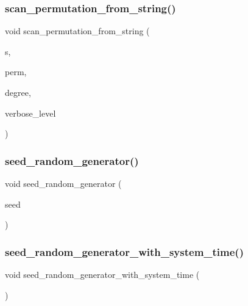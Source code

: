 \subsubsection{\texorpdfstring{scan\+\_\+permutation\+\_\+from\+\_\+string()}{scan\_permutation\_from\_string()}}
{\footnotesize\ttfamily void scan\+\_\+permutation\+\_\+from\+\_\+string (\begin{DoxyParamCaption}\item[{const char $\ast$}]{s,  }\item[{\mbox{\hyperlink{galois_8h_a09fddde158a3a20bd2dcadb609de11dc}{I\+NT}} $\ast$\&}]{perm,  }\item[{\mbox{\hyperlink{galois_8h_a09fddde158a3a20bd2dcadb609de11dc}{I\+NT}} \&}]{degree,  }\item[{\mbox{\hyperlink{galois_8h_a09fddde158a3a20bd2dcadb609de11dc}{I\+NT}}}]{verbose\+\_\+level }\end{DoxyParamCaption})}

\mbox{\label{util_8_c_a4a73fe7c1b8801c8a2cf489ee793f06a}} 
\subsubsection{\texorpdfstring{seed\+\_\+random\+\_\+generator()}{seed\_random\_generator()}}
{\footnotesize\ttfamily void seed\+\_\+random\+\_\+generator (\begin{DoxyParamCaption}\item[{\mbox{\hyperlink{galois_8h_a09fddde158a3a20bd2dcadb609de11dc}{I\+NT}}}]{seed }\end{DoxyParamCaption})}

\mbox{\label{util_8_c_a564b2bcc7789f70794b0df0888ae65bf}} 
\subsubsection{\texorpdfstring{seed\+\_\+random\+\_\+generator\+\_\+with\+\_\+system\+\_\+time()}{seed\_random\_generator\_with\_system\_time()}}
{\footnotesize\ttfamily void seed\+\_\+random\+\_\+generator\+\_\+with\+\_\+system\+\_\+time (\begin{DoxyParamCaption}{ }\end{DoxyParamCaption})}

